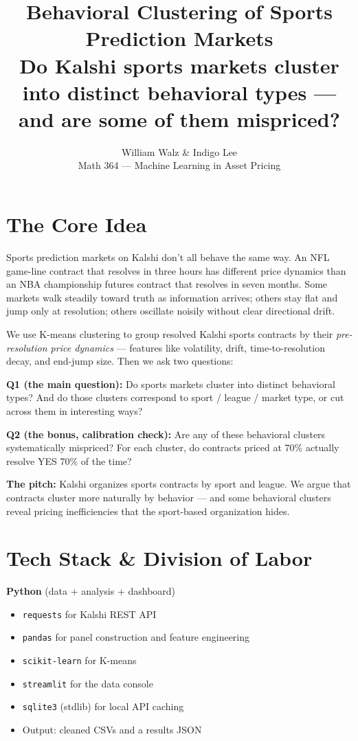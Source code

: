 \documentclass[11pt]{article}
\title{\textbf{Behavioral Clustering of Sports Prediction Markets}\\[0.3em]
\large Do Kalshi sports markets cluster into distinct behavioral types --- and are some of them mispriced?}
\author{William Walz \& Indigo Lee \\ Math 364 --- Machine Learning in Asset Pricing}
\date{}
\begin{document}
\maketitle

\section{The Core Idea}

Sports prediction markets on Kalshi don't all behave the same way. An NFL game-line contract that resolves in three hours has different price dynamics than an NBA championship futures contract that resolves in seven months. Some markets walk steadily toward truth as information arrives; others stay flat and jump only at resolution; others oscillate noisily without clear directional drift.

We use K-means clustering to group resolved Kalshi sports contracts by their \textit{pre-resolution price dynamics} --- features like volatility, drift, time-to-resolution decay, and end-jump size. Then we ask two questions:

\textbf{Q1 (the main question):} Do sports markets cluster into distinct behavioral types? And do those clusters correspond to sport / league / market type, or cut across them in interesting ways?

\textbf{Q2 (the bonus, calibration check):} Are any of these behavioral clusters systematically mispriced? For each cluster, do contracts priced at 70\% actually resolve YES 70\% of the time?

\textbf{The pitch:} Kalshi organizes sports contracts by sport and league. We argue that contracts cluster more naturally by behavior --- and some behavioral clusters reveal pricing inefficiencies that the sport-based organization hides.

\section{Tech Stack \& Division of Labor}

\textbf{Python} (data + analysis + dashboard)
\begin{itemize}[leftmargin=*, itemsep=0pt]
    \item \texttt{requests} for Kalshi REST API
    \item \texttt{pandas} for panel construction and feature engineering
    \item \texttt{scikit-learn} for K-means
    \item \texttt{streamlit} for the data console
    \item \texttt{sqlite3} (stdlib) for local API caching
    \item Output: cleaned CSVs and a results JSON
\end{itemize}
\end{document}
